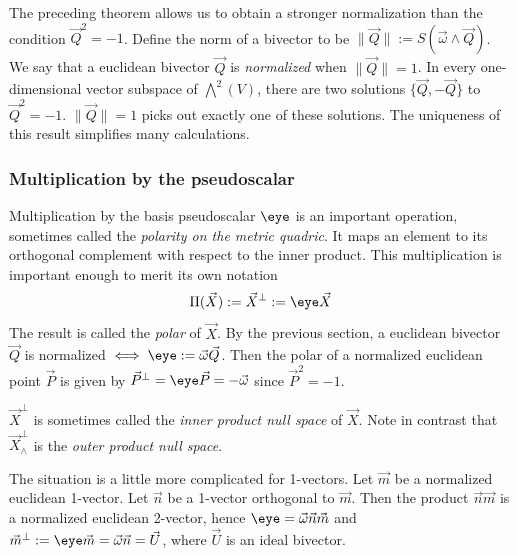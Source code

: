 \documentclass{birkjour}
\begin{document}
The preceding theorem allows us to obtain a stronger normalization than the condition $\vec{Q}^{2}=-1$.  Define the norm of a bivector to be $\| \vec{Q} \| := S(\vec{\omega} \wedge \vec{Q})$.  We say that a euclidean bivector $\vec{Q}$ is \emph{normalized} when $\| \vec{Q} \| = 1$.    In every one-dimensional vector subspace of $\bigwedge^{2}(V)$, there are two solutions $\{ \vec{Q}, -\vec{Q}\}$ to $\vec{Q}^{2}=-1$. $\| \vec{Q} \| = 1$ picks out exactly one of these solutions. The uniqueness of this result simplifies many calculations.

\subsubsection{Multiplication by the pseudoscalar}
 Multiplication by the basis pseudoscalar $\eye$ is an important operation, sometimes called the \emph{polarity on the metric quadric}. It maps an element to its orthogonal complement with respect to the inner product.  This multiplication is important enough to merit its own notation \[\Pi(\vec{X}) := \vec{X}^{\perp} := \eye \vec{X}\] The result is  called the  \emph{polar} of $\vec{X}$.  By the previous section,  a euclidean bivector $\vec{Q}$ is normalized $\iff  \eye := \vec{\omega} \vec{Q}$.  Then the polar of a normalized euclidean point $\vec{P}$ is given by $ \vec{P}^{\perp} =  \eye \vec{P} =  -\vec{\omega}$ since $\vec{P}^{2} = -1$.  
 
 $\vec{X}^\perp$ is sometimes called the \emph{inner product null space} of $\vec{X}$.  Note in contrast that $\vec{X}^\perp_{\wedge}$ is the \emph{outer product null space}.
 
 The situation is a little more complicated for 1-vectors. Let $\vec{m}$ be a normalized euclidean 1-vector.  Let $\vec{n}$ be a 1-vector orthogonal to $\vec{m}$. Then the product $\vec{n}\vec{m}$ is a normalized euclidean 2-vector, hence $\eye = \vec{\omega}\vec{n}\vec{m}$ and $\vec{m}^{\perp} := \eye \vec{m} = \vec{\omega} \vec{n} = \vec{U}$, where $\vec{U}$ is an ideal bivector.   
 
\end{document}
